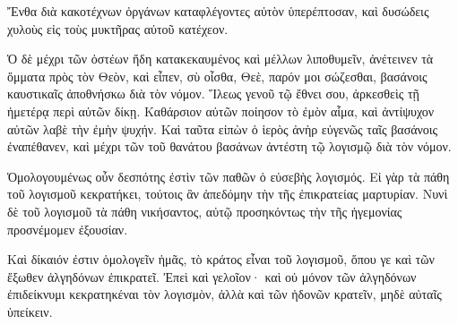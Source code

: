 {Ἔνθα διὰ κακοτέχνων ὀργάνων καταφλέγοντες αὐτὸν ὑπερέπτοσαν, καὶ δυσώδεις χυλοὺς εἰς τοὺς μυκτῆρας αὐτοῦ κατέχεον.
\par }{\PP {}Ὁ δὲ μέχρι τῶν ὀστέων ἤδη κατακεκαυμένος καὶ μέλλων λιποθυμεῖν, ἀνέτεινεν τὰ ὄμματα πρὸς τὸν Θεὸν, καὶ εἶπεν, σὺ οἶσθα, Θεὲ, παρόν μοι σώζεσθαι,
βασάνοις καυστικαῖς ἀποθνήσκω διὰ τὸν νόμον.
Ἵλεως γενοῦ τῷ ἔθνει σου, ἀρκεσθεὶς τῇ ἡμετέρᾳ περὶ αὐτῶν δίκῃ.
Καθάρσιον αὐτῶν ποίησον τὸ ἐμὸν αἷμα, καὶ ἀντίψυχον αὐτῶν λαβὲ τὴν ἐμὴν ψυχήν.
Καὶ ταῦτα εἰπὼν ὁ ἱερὸς ἀνὴρ εὐγενῶς ταῖς βασάνοις ἐναπέθανεν, καὶ μέχρι τῶν τοῦ θανάτου βασάνων ἀντέστη τῷ λογισμῷ διὰ τὸν νόμον.
\par }{\PP {}Ὁμολογουμένως οὖν δεσπότης ἐστὶν τῶν παθῶν ὁ εὐσεβὴς λογισμός.
Εἰ γὰρ τὰ πάθη τοῦ λογισμοῦ κεκρατήκει, τούτοις ἂν ἀπεδόμην τὴν τῆς ἐπικρατείας μαρτυρίαν.
Νυνὶ δὲ τοῦ λογισμοῦ τὰ πάθη νικήσαντος, αὐτῷ προσηκόντως τὴν τῆς ἡγεμονίας προσνέμομεν ἐξουσίαν.
\par }{\PP {}Καὶ δίκαιόν ἐστιν ὁμολογεῖν ἡμᾶς, τὸ κράτος εἶναι τοῦ λογισμοῦ, ὅπου γε καὶ τῶν ἔξωθεν ἀλγηδόνων ἐπικρατεῖ.
Ἐπεὶ καὶ γελοῖον· καὶ οὐ μόνον τῶν ἀλγηδόνων ἐπιδείκνυμι κεκρατηκέναι τὸν λογισμὸν, ἀλλὰ καὶ τῶν ἡδονῶν κρατεῖν, μηδὲ αὐταῖς ὑπείκειν.

}
